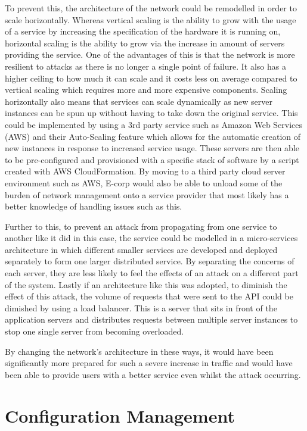 \documentclass[]{report}
\begin{document}
To prevent this, the architecture of the network could be remodelled in order to scale horizontally. Whereas vertical scaling is the ability to grow with the usage of a service by increasing the specification of the hardware it is running on, horizontal scaling is the ability to grow via the increase in amount of servers providing the service. One of the advantages of this is that the network is more resilient to attacks as there is no longer a single point of failure. It also has a higher ceiling to how much it can scale and it costs less on average compared to vertical scaling which requires more and more expensive components. Scaling horizontally also means that services can scale dynamically as new server instances can be spun up without having to take down the original service. This could be implemented by using a 3rd party service such as Amazon Web Services (AWS) and their Auto-Scaling feature which allows for the automatic creation of new instances in response to increased service usage. These servers are then able to be pre-configured and provisioned with a specific stack of software by a script created with AWS CloudFormation. By moving to a third party cloud server environment such as AWS, E-corp would also be able to unload some of the burden of network management onto a service provider that most likely has a better knowledge of handling issues such as this.

Further to this, to prevent an attack from propagating from one service to another like it did in this case, the service could be modelled in a micro-services architecture in which different smaller services are developed and deployed separately to form one larger distributed service. By separating the concerns of each server, they are less likely to feel the effects of an attack on a different part of the system. Lastly if an architecture like this was adopted, to diminish the effect of this attack, the volume of requests that were sent to the API could be dimished by using a load balancer. This is a server that sits in front of the application servers and distributes requests between multiple server instances to stop one single server from becoming overloaded.

By changing the network's architecture in these ways, it would have been significantly more prepared for such a severe increase in traffic and would have been able to provide users with a better service even whilst the attack occurring.

\section*{Configuration Management}
\end{document}
